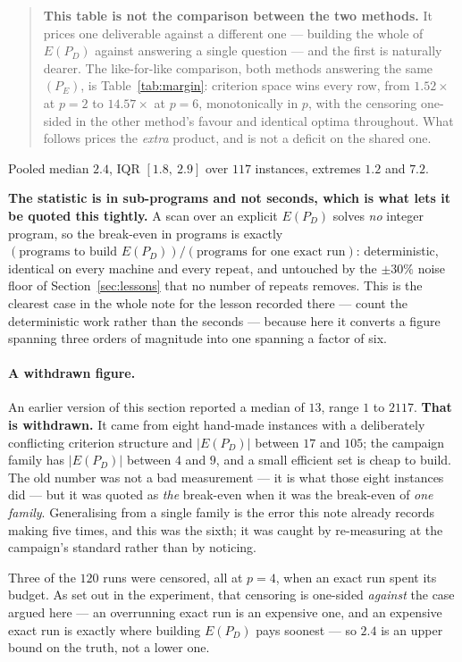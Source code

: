 \documentclass[11pt,a4paper]{article}
\newcommand{\Dset}{D}
\newcommand{\E}{E(P_{\Dset})}
\begin{document}
\begin{quote}
\textbf{This table is not the comparison between the two methods.}  It prices
one deliverable against a different one --- building the whole of $\E$ against
answering a single question --- and the first is naturally dearer.  The
like-for-like comparison, both methods answering the same $(P_E)$, is
Table~\ref{tab:margin}: criterion space wins every row, from $1.52\times$ at
$p=2$ to $14.57\times$ at $p=6$, monotonically in $p$, with the censoring
one-sided in the other method's favour and identical optima throughout.  What
follows prices the \emph{extra} product, and is not a deficit on the shared
one.
\end{quote}

\noindent
Pooled median $\mathbf{2.4}$, IQR $[1.8,\ 2.9]$ over $117$ instances, extremes
$1.2$ and $7.2$.

\textbf{The statistic is in sub-programs and not seconds, which is what lets it
be quoted this tightly.}  A scan over an explicit $\E$ solves \emph{no} integer
program, so the break-even in programs is exactly $(\text{programs to build }
\E)/(\text{programs for one exact run})$: deterministic, identical on every
machine and every repeat, and untouched by the $\pm 30\%$ noise floor of
Section~\ref{sec:lessons} that no number of repeats removes.  This is the
clearest case in the whole note for the lesson recorded there --- count the
deterministic work rather than the seconds --- because here it converts a
figure spanning three orders of magnitude into one spanning a factor of six.

\paragraph{A withdrawn figure.}
An earlier version of this section reported a median of $13$, range $1$ to
$2117$.  \textbf{That is withdrawn.}  It came from eight hand-made instances
with a deliberately conflicting criterion structure and $|\E|$ between $17$ and
$105$; the campaign family has $|\E|$ between $4$ and $9$, and a small
efficient set is cheap to build.  The old number was not a bad measurement ---
it is what those eight instances did --- but it was quoted as \emph{the}
break-even when it was the break-even of \emph{one family}.  Generalising from
a single family is the error this note already records making five times, and
this was the sixth; it was caught by re-measuring at the campaign's standard
rather than by noticing.

Three of the $120$ runs were censored, all at $p=4$, when an exact run spent
its budget.  As set out in the experiment, that censoring is one-sided
\emph{against} the case argued here --- an overrunning exact run is an
expensive one, and an expensive exact run is exactly where building $\E$ pays
soonest --- so $2.4$ is an upper bound on the truth, not a lower one.
\end{document}
